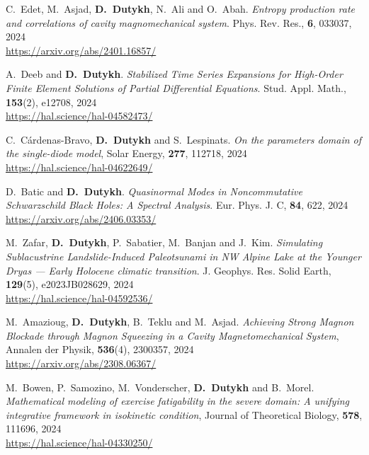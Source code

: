 \documentclass[final, a4paper, oneside, 12pt]{article}
\numberwithin{equation}{section}
\begin{document}
\begin{etaremune}
  \item C.~Edet, M.~Asjad, \textbf{D.~Dutykh}, N.~Ali and O.~Abah. \textit{Entropy production rate and correlations of cavity magnomechanical system}. Phys. Rev. Res., \textbf{6}, 033037, 2024 \\ %
  \url{https://arxiv.org/abs/2401.16857/}

  \item A.~Deeb and \textbf{D.~Dutykh}. \textit{Stabilized Time Series Expansions for High-Order Finite Element Solutions of Partial Differential Equations}. Stud. Appl. Math., \textbf{153}(2), e12708, 2024 \\ %
  \url{https://hal.science/hal-04582473/}
  
  \item C.~C\'ardenas-Bravo, \textbf{D.~Dutykh} and S.~Lespinats. \textit{On the parameters domain of the single-diode model}, Solar Energy, \textbf{277}, 112718, 2024 \\ %
  \url{https://hal.science/hal-04622649/}
  
  \item D.~Batic and \textbf{D.~Dutykh}. \textit{Quasinormal Modes in Noncommutative Schwarzschild Black Holes: A Spectral Analysis}. Eur. Phys. J. C, \textbf{84}, 622, 2024 \\ %
  \url{https://arxiv.org/abs/2406.03353/}

  \item M.~Zafar, \textbf{D.~Dutykh}, P.~Sabatier, M.~Banjan and J.~Kim. \textit{Simulating Sublacustrine Landslide-Induced Paleotsunami in NW Alpine Lake at the Younger Dryas --- Early Holocene climatic transition}. J. Geophys. Res. Solid Earth, \textbf{129}(5), e2023JB028629, 2024 \\ %
  \url{https://hal.science/hal-04592536/}
  
  \item M.~Amazioug, \textbf{D.~Dutykh}, B.~Teklu and M.~Asjad. \textit{Achieving Strong Magnon Blockade through Magnon Squeezing in a Cavity Magnetomechanical System}, Annalen der Physik, \textbf{536}(4), 2300357, 2024 \\ %
  \url{https://arxiv.org/abs/2308.06367/}
  
  \item M.~Bowen, P.~Samozino, M.~Vonderscher, \textbf{D.~Dutykh} and B.~Morel. \textit{Mathematical modeling of exercise fatigability in the severe domain: A unifying integrative framework in isokinetic condition}, Journal of Theoretical Biology, \textbf{578}, 111696, 2024 \\ %
  \url{https://hal.science/hal-04330250/}
  

\end{etaremune}
\end{document}
